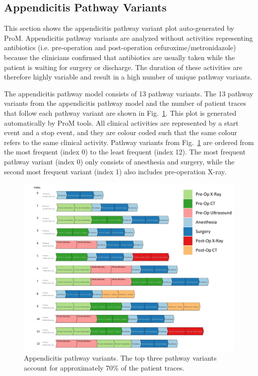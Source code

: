 \documentclass{elsarticle}
\begin{document}
\subsection{Appendicitis Pathway Variants}
This section shows the appendicitis pathway variant plot auto-generated by ProM. Appendicitis pathway variants are analyzed without activities representing antibiotics (i.e. pre-operation and post-operation cefuroxime/metronidazole) because the clinicians confirmed that antibiotics are usually taken while the patient is waiting for surgery or discharge. The duration of these activities are therefore highly variable and result in a high number of unique pathway variants.

The appendicitis pathway model consists of 13 pathway variants. The 13 pathway variants from the appendicitis pathway model and the number of patient traces that follow each pathway variant are shown in Fig.~\ref{fig:appendicitis pathway variants}. This plot is generated automatically by ProM tools. All clinical activities are represented by a start event and a stop event, and they are colour coded such that the same colour refers to the same clinical activity. Pathway variants from Fig.~\ref{fig:appendicitis pathway variants} are ordered from the most frequent (index 0) to the least frequent (index 12). The most frequent pathway variant (index 0) only consists of anesthesia and surgery, while the second most frequent variant (index 1) also includes pre-operation X-ray.

\begin{figure}[t]
\hspace{-2cm}
\includegraphics[width=1.5\textwidth]{images/appendicitis_variant_index_anes.jpg}
\caption{Appendicitis pathway variants. The top three pathway variants account for approximately 70\% of the patient traces.}
\label{fig:appendicitis pathway variants}
\end{figure}
\clearpage
\end{document}
